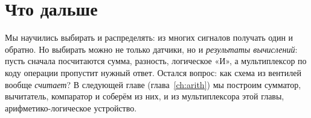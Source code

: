 \section{Что дальше}

Мы научились выбирать и распределять: из многих сигналов получать один и
обратно. Но выбирать можно не только датчики, но и \emph{результаты
вычислений}: пусть сначала посчитаются сумма, разность, логическое «И», а
мультиплексор по коду операции пропустит нужный ответ. Остался вопрос: как
схема из вентилей вообще \emph{считает}? В следующей главе
(глава~\ref{ch:arith}) мы построим сумматор, вычитатель, компаратор и соберём
из них, и из мультиплексора этой главы, арифметико-логическое устройство.
